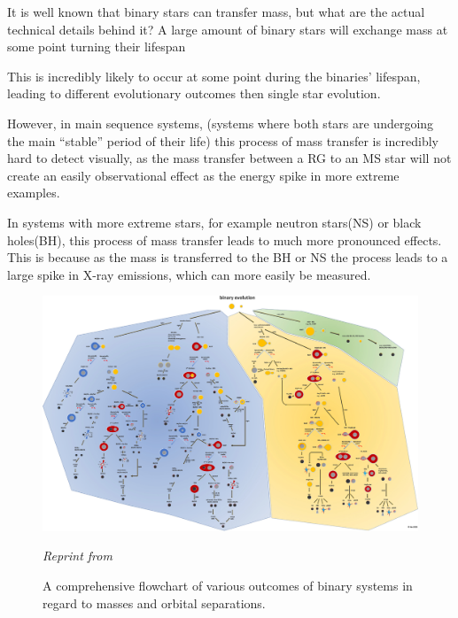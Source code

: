 \documentclass[12pt, letterpaper]{article}
\begin{document}
    It is well known that binary stars can transfer mass, but what are the actual technical details behind it? A large amount of binary stars will exchange mass at some point turning their lifespan \cite{Chen_2024}

    This is incredibly likely to occur at some point during the binaries' lifespan, leading to different evolutionary outcomes then single star evolution. 
    
    However, in main sequence systems, (systems where both stars are undergoing the main ``stable'' period of their life) this process of mass transfer is incredibly hard to detect visually, as the mass transfer between a RG to an MS star will not create an easily observational effect as the energy spike in more extreme examples.

    In systems with more extreme stars, for example neutron stars(NS) or black holes(BH), this process of mass transfer leads to much more pronounced effects. This is because as the mass is transferred to the BH or NS the process leads to a large spike in X-ray emissions, which can more easily be measured.

    \vspace*{\fill}
    \begin{figure}[h!]
        \centering
        \includegraphics[width=\textwidth]{figs/Binary Evolution Flowchart.jpg}
        \caption{A comprehensive flowchart of various outcomes of binary systems in regard to masses and orbital separations.}
        \label{fig:binary_evolution_flowchart}
        \textit{\small Reprint from \cite{Chen_2024}}
    \end{figure}
    \vspace*{\fill}
    \restoregeometry
\end{document}
